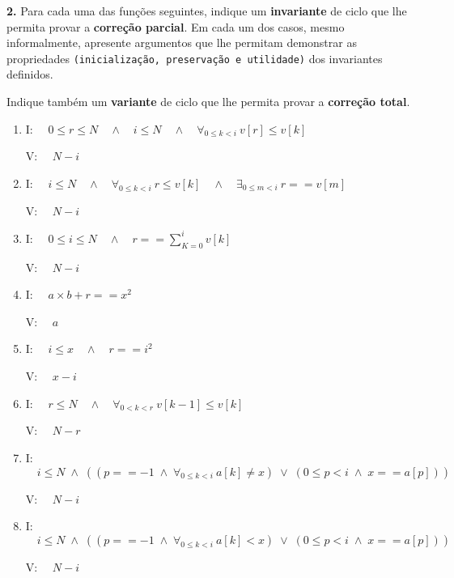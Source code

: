 \documentclass{article}
\begin{document}
\noindent \textbf{2.} Para cada uma das funções seguintes, indique um \textbf{invariante} de ciclo que lhe permita provar a \textbf{correção parcial}. Em cada um dos casos, mesmo informalmente, apresente argumentos que lhe permitam demonstrar as propriedades \texttt{(inicialização, preservação e utilidade)} dos invariantes definidos.

\noindent Indique também um \textbf{variante} de ciclo que lhe permita provar a \textbf{correção total}.

\begin{enumerate}[label=\alph*)]
    \item I: $ \quad 0 \leq r \leq N \quad \land \quad i \leq N \quad \land \quad \forall_{0 \le k < i} \  v[r] \leq v[k] $
    
    V: $ \quad N - i $
    
    \item I: $ \quad i \leq N \quad \land \quad \forall_{0 \leq k < i} \  r \leq v[k] \quad \land \quad \exists_{0 \leq m < i} \  r == v[m] $
    
    V: $ \quad N - i $
    
    \item I: $ \quad 0 \leq i \leq N \quad \land \quad r == \sum_{K = 0}^{i} v[k] $
    
    V: $ \quad N - i $
    
    \item I: $ \quad a \times b + r == x^2 $
    
    V: $ \quad a $
    
    \item I: $ \quad i \leq x \quad \land \quad r == i^2 $
    
    V: $ \quad x - i $
    
    \item I: $ \quad r \leq N \quad \land \quad \forall_{0 < k < r} \  v[k-1] \leq v[k] $
    
    V: $ \quad N - r $
    
    \item I: $ \quad i \leq N \; \land \; ((p == -1 \; \land \; \forall_{0 \le k < i} \  a[k] \neq x) \; \lor \; (0 \leq p < i \; \land \; x == a[p])) $
    
    V: $ \quad N - i $
    
    \item I: $ \quad i \leq N \; \land \; ((p == -1 \; \land \; \forall_{0 \le k < i} \  a[k] < x) \; \lor \; (0 \leq p < i \; \land \; x == a[p])) $
    
    V: $ \quad N - i $
    

\end{enumerate}
\end{document}
